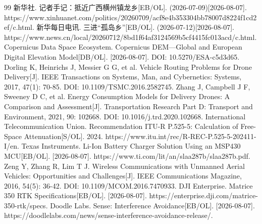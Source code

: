 \documentclass[bwprint]{gmcmthesis}
\begin{document}
\pagestyle{plain}












\begin{thebibliography}{99}
 新华社. 记者手记：抵近广西横州镇龙乡[EB/OL]. (2026-07-09)[2026-08-07]. https://www.xinhuanet.com/politics/20260709/acf8e4b353304bb78007d8224f1cd2ef/c.html.
 新华每日电讯. 三进“孤岛乡”[EB/OL]. (2026-07-12)[2026-08-07]. https://www.news.cn/local/20260712/8bd1f64af3124569b5cf4415fc013acd/c.html.
 Copernicus Data Space Ecosystem. Copernicus DEM—Global and European Digital Elevation Model[DB/OL]. [2026-08-07]. DOI: 10.5270/ESA-c5d3d65.
 Dorling K, Heinrichs J, Messier G G, et al. Vehicle Routing Problems for Drone Delivery[J]. IEEE Transactions on Systems, Man, and Cybernetics: Systems, 2017, 47(1): 70-85. DOI: 10.1109/TSMC.2016.2582745.
 Zhang J, Campbell J F, Sweeney D C, et al. Energy Consumption Models for Delivery Drones: A Comparison and Assessment[J]. Transportation Research Part D: Transport and Environment, 2021, 90: 102668. DOI: 10.1016/j.trd.2020.102668.
 International Telecommunication Union. Recommendation ITU-R P.525-5: Calculation of Free-Space Attenuation[S/OL]. 2024. https://www.itu.int/rec/R-REC-P.525-5-202411-I/en.
 Texas Instruments. Li-Ion Battery Charger Solution Using an MSP430 MCU[EB/OL]. [2026-08-07]. https://www.ti.com/lit/an/slaa287b/slaa287b.pdf.
 Zeng Y, Zhang R, Lim T J. Wireless Communications with Unmanned Aerial Vehicles: Opportunities and Challenges[J]. IEEE Communications Magazine, 2016, 54(5): 36-42. DOI: 10.1109/MCOM.2016.7470933.
 DJI Enterprise. Matrice 350 RTK Specifications[EB/OL]. [2026-08-07]. https://enterprise.dji.com/matrice-350-rtk/specs.
 Doodle Labs. Sense: Interference Avoidance[EB/OL]. [2026-08-07]. https://doodlelabs.com/news/sense-interference-avoidance-release/.
\end{thebibliography}

\begin{appendices}

\end{appendices}

\clearpage

\end{document}
